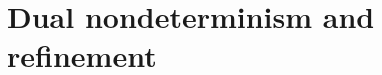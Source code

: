 \documentclass[aspectratio=54]{beamer}
\newcommand{\htr}[3]{{ {#1} \mathbbm{\{} {#2} \mathbbm{\}} {#3} }}
\begin{document}


\section{Dual nondeterminism and refinement} %

%
%
%
\end{document}
